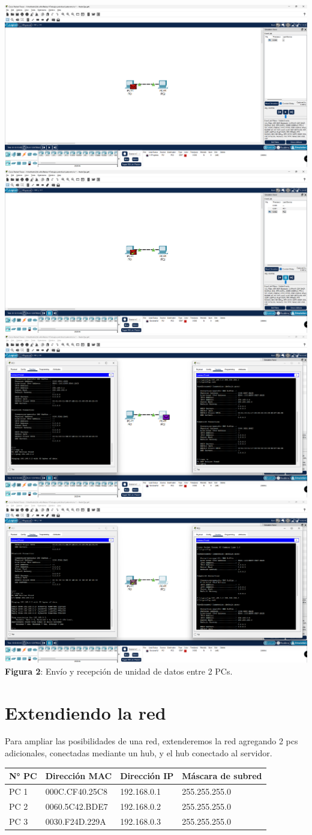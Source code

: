 \documentclass{article}
\begin{document}
    \begin{center}
        \includegraphics[width=0.45\linewidth]{img_04} 
        \includegraphics[width=0.45\linewidth]{img_03} 
        \includegraphics[width=0.45\linewidth]{img_06} 
        \includegraphics[width=0.45\linewidth]{img_05} 
        \linebreak
        \small {\bfseries Figura 2}: Envío y recepción de unidad de datos entre 2 PCs.
    \end{center}

    \pagebreak
    \section{Extendiendo la red}
    Para ampliar las posibilidades de una red, extenderemos la red agregando 2 pcs adicionales, conectadas mediante un hub, y el hub conectado al servidor. 

    \begin{center}
        \begin{tabular}{| p{3cm} | p{4.1cm} | p{4.1cm} | p{4.1cm} |}
            \hline
            {\bfseries N° PC} & {\bfseries Dirección MAC} & {\bfseries Dirección IP} & {\bfseries Máscara de subred} \\\hline
            PC 1 & 000C.CF40.25C8 & 192.168.0.1 & 255.255.255.0 \\\hline
            PC 2 & 0060.5C42.BDE7 & 192.168.0.2 & 255.255.255.0 \\\hline
            PC 3 & 0030.F24D.229A & 192.168.0.3 & 255.255.255.0 \\\hline
        \end{tabular}
    \end{center} 
\end{document}

